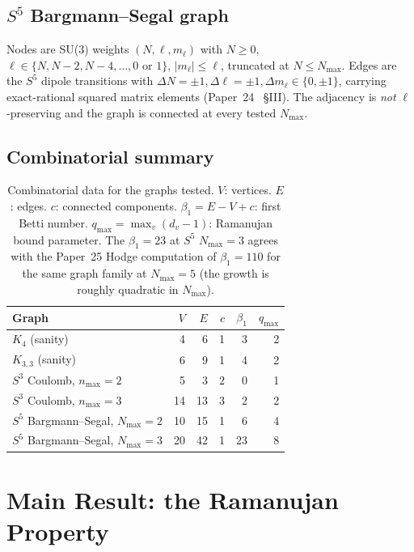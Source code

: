 \documentclass[11pt]{article}
\begin{document}
\subsection{$S^5$ Bargmann--Segal graph}

Nodes are SU(3) weights $(N,\ell,m_\ell)$ with $N\ge 0$,
$\ell\in\{N, N{-}2, N{-}4, \ldots, 0\text{ or }1\}$,
$|m_\ell|\le\ell$, truncated at $N\le N_{\max}$.  Edges are the $S^5$
dipole transitions with $\Delta N=\pm 1, \Delta\ell=\pm 1,
\Delta m_\ell\in\{0,\pm 1\}$, carrying exact-rational squared
matrix elements (Paper~24~\cite{paper24} \S III).  The adjacency is
\emph{not} $\ell$-preserving and the graph is connected at every
tested $N_{\max}$.

\subsection{Combinatorial summary}

\begin{table}[h]
\centering
\begin{tabular}{lrrrrr}
\toprule
Graph & $V$ & $E$ & $c$ & $\beta_1$ & $q_{\max}$ \\
\midrule
$K_4$ (sanity) & 4 & 6 & 1 & 3 & 2 \\
$K_{3,3}$ (sanity) & 6 & 9 & 1 & 4 & 2 \\
$S^3$ Coulomb, $n_{\max}=2$ & 5 & 3 & 2 & 0 & 1 \\
$S^3$ Coulomb, $n_{\max}=3$ & 14 & 13 & 3 & 2 & 2 \\
$S^5$ Bargmann--Segal, $N_{\max}=2$ & 10 & 15 & 1 & 6 & 4 \\
$S^5$ Bargmann--Segal, $N_{\max}=3$ & 20 & 42 & 1 & 23 & 8 \\
\bottomrule
\end{tabular}
\caption{Combinatorial data for the graphs tested.  $V$: vertices.
$E$: edges.  $c$: connected components.  $\beta_1=E-V+c$: first Betti
number.  $q_{\max}=\max_v(d_v-1)$: Ramanujan bound parameter.  The
$\beta_1=23$ at $S^5$ $N_{\max}=3$ agrees with the Paper~25 Hodge
computation of $\beta_1=110$ for the same graph family at $N_{\max}=5$
(the growth is roughly quadratic in $N_{\max}$).}
\label{tab:combinatorics}
\end{table}

\section{Main Result: the Ramanujan Property}
\label{sec:main_result}
\end{document}
